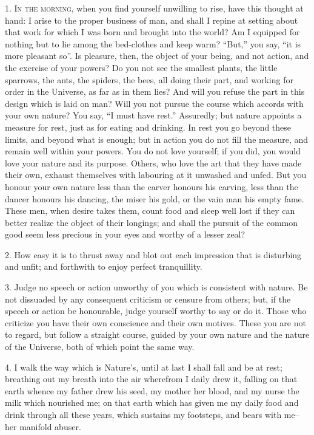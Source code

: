 \documentclass{book}
\begin{document}
1. \textsc{In the morning,} when you find yourself unwilling to rise,
have this thought at hand: I arise to the proper business of man, and
shall I repine at setting about that work for which I was born and
brought into the world? Am I equipped for nothing but to lie among the
bed-clothes and keep warm? ``But,'' you say, ``it is more pleasant so''.
Is pleasure, then, the object of your being, and not action, and the
exercise of your powers? Do you not see the smallest plants, the little
sparrows, the ants, the spiders, the bees, all doing their part, and
working for order in the Universe, as far as in them lies? And will you
refuse the part in this design which is laid on man? Will you not pursue
the course which accords with your own nature? You say, ``I must have
rest.'' Assuredly; but nature appoints a measure for rest, just as for
eating and drinking. In rest you go beyond these limits, and beyond what
is enough; but in action you do not fill the measure, and remain well
within your powers. You do not love yourself; if you did, you would love
your nature and its purpose. Others, who love the art that they have
made their own, exhaust themselves with labouring at it unwashed and
unfed. But you honour your own nature less than the carver honours his
carving, less than the dancer honours his dancing, the miser his gold,
or the vain man his empty fame. These men, when desire takes them, count
food and sleep well lost if they can better realize the object of their
longings; and shall the pursuit of the common good seem less precious in
your eyes and worthy of a lesser zeal?

2. How easy it is to thrust away and blot out each impression that is
disturbing and unfit; and forthwith to enjoy perfect tranquillity.

3. Judge no speech or action unworthy of you which is consistent with
nature. Be not dissuaded by any consequent criticism or censure from
others; but, if the speech or action be honourable, judge yourself
worthy to say or do it. Those who criticize you have their own
conscience and their own motives. These you are not to regard, but
follow a straight course, guided by your own nature and the nature of
the Universe, both of which point the same way.

4. I walk the way which is Nature's, until at last I shall fall and be
at rest; breathing out my breath into the air wherefrom I daily drew
it, falling on that earth whence my father drew his seed, my mother
her blood, and my nurse the milk which nourished me; on that earth
which has given me my daily food and drink through all these years,
which sustains my footsteps, and bears with me--her manifold abuser.
\end{document}
